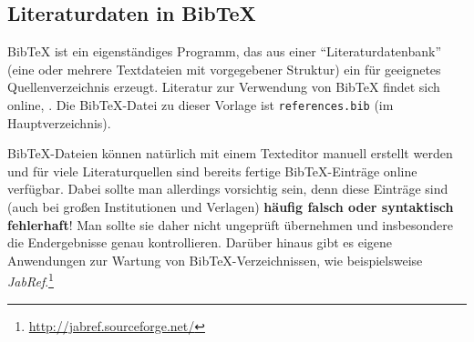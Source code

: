 \subsection{Literaturdaten in BibTeX}
\label{sec:bibtex}

BibTeX ist ein eigenständiges Programm, das aus einer "`Literaturdatenbank"' (eine oder mehrere
Textdateien mit vorgegebener Struktur) ein für \latex geeignetes Quellenverzeichnis
erzeugt. Literatur zur Verwendung von BibTeX findet sich online, \zB \cite{Feder2006, Patashnik1988}.
Die BibTeX-Datei zu dieser Vorlage ist \nolinkurl{references.bib} (im Hauptverzeichnis).

BibTeX-Dateien können natürlich mit einem Texteditor manuell erstellt werden und für
viele Literaturquellen sind bereits fertige BibTeX-Einträge online verfügbar.
Dabei sollte man allerdings vorsichtig sein, denn diese Einträge sind (auch bei großen
Institutionen und Verlagen) \textbf{häufig falsch oder syntaktisch fehlerhaft}!
Man sollte sie daher nicht ungeprüft übernehmen und insbesondere die Endergebnisse genau kontrollieren.
Darüber hinaus gibt es eigene Anwendungen zur Wartung von
BibTeX-Verzeichnissen, wie beispielsweise
\emph{JabRef}.\footnote{\url{http://jabref.sourceforge.net/}}



